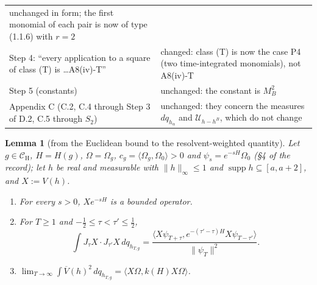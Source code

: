 \documentclass[11pt,a4paper]{article}
\newcommand{\CH}{\mathcal{C}_{\mathrm H}}
\newcommand{\Om}{\Omega}
\newcommand{\ip}[2]{\langle #1,#2\rangle}
\DeclareMathOperator{\supp}{supp}
\newcommand{\Uc}{\mathcal U}
\newcommand{\Vb}{\overline V}                 %
\theoremstyle{plain}
\newtheorem{tlemma}{Lemma}
\theoremstyle{definition}
\begin{document}
\begin{center}
\begin{tabular}{@{}p{}p{}@{}}
unchanged in form; the first monomial of each pair is now of type (1.1.6) with $r=2$\\
Step 4: ``every application to a square of class (T) is \dots A8(iv)-T'' & changed: class (T)
is now the case P4 (two time-integrated monomials), not A8(iv)-T\\
Step 5 (constants) & unchanged: the constant is $M_B^2$\\
Appendix C (C.2, C.4 through Step 3 of D.2, C.5 through $S_2$) & unchanged: they concern the
measures $dq_{h_\alpha}$ and $\Uc_{h-h^B}$, which do not change\\
\bottomrule
\end{tabular}
\end{center}

\begin{tlemma}[from the Euclidean bound to the resolvent-weighted quantity]\label{lem:fkn}
Let $g\in\CH$, $H=H(g)$, $\Om=\Om_g$, $c_g=\ip{\Om_g}{\Om_0}>0$ and
$\psi_s=e^{-sH}\Om_0$ (\S4 of the record); let $h$ be real and measurable with
$\|h\|_\infty\le1$ and $\supp h\subseteq[a,a+2]$, and $X:=V(h)$.
\begin{enumerate}
\item[\rm(i)] For every $s>0$, $Xe^{-sH}$ is a bounded operator.
\item[\rm(ii)] For $T\ge1$ and $-\frac12\le\tau<\tau'\le\frac12$,
\[
 \int J_\tau X\cdot J_{\tau'}X\,dq_{h_{T,g}}
 =\frac{\ip{X\psi_{T+\tau}}{e^{-(\tau'-\tau)H}X\psi_{T-\tau'}}}{\|\psi_T\|^2} .
\]
\item[\rm(iii)] $\lim_{T\to\infty}\int\Vb(h)^2\,dq_{h_{T,g}}=\ip{X\Om}{k(H)X\Om}$.
\end{enumerate}
\end{tlemma}
\end{document}
